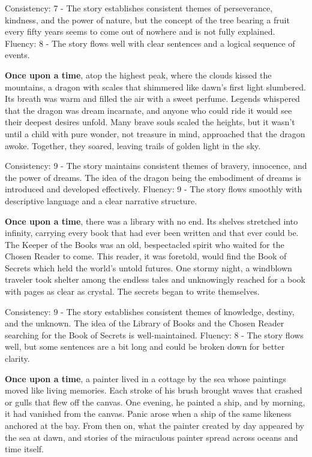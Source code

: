 \documentclass{article}
\begin{document}
Consistency: 7 - The story establishes consistent themes of perseverance, kindness, and the power of nature, but the concept of the tree bearing a fruit every fifty years seems to come out of nowhere and is not fully explained.
Fluency: 8 - The story flows well with clear sentences and a logical sequence of events.

\textbf{Once upon a time}, atop the highest peak, where the clouds kissed the mountains, a dragon with scales that shimmered like dawn's first light slumbered. Its breath was warm and filled the air with a sweet perfume. Legends whispered that the dragon was dream incarnate, and anyone who could ride it would see their deepest desires unfold. Many brave souls scaled the heights, but it wasn't until a child with pure wonder, not treasure in mind, approached that the dragon awoke. Together, they soared, leaving trails of golden light in the sky.

Consistency: 9 - The story maintains consistent themes of bravery, innocence, and the power of dreams. The idea of the dragon being the embodiment of dreams is introduced and developed effectively.
Fluency: 9 - The story flows smoothly with descriptive language and a clear narrative structure.

\textbf{Once upon a time}, there was a library with no end. Its shelves stretched into infinity, carrying every book that had ever been written and that ever could be. The Keeper of the Books was an old, bespectacled spirit who waited for the Chosen Reader to come. This reader, it was foretold, would find the Book of Secrets which held the world's untold futures. One stormy night, a windblown traveler took shelter among the endless tales and unknowingly reached for a book with pages as clear as crystal. The secrets began to write themselves.

Consistency: 9 - The story establishes consistent themes of knowledge, destiny, and the unknown. The idea of the Library of Books and the Chosen Reader searching for the Book of Secrets is well-maintained.
Fluency: 8 - The story flows well, but some sentences are a bit long and could be broken down for better clarity.

\textbf{Once upon a time}, a painter lived in a cottage by the sea whose paintings moved like living memories. Each stroke of his brush brought waves that crashed or gulls that flew off the canvas. One evening, he painted a ship, and by morning, it had vanished from the canvas. Panic arose when a ship of the same likeness anchored at the bay. From then on, what the painter created by day appeared by the sea at dawn, and stories of the miraculous painter spread across oceans and time itself.
\end{document}
